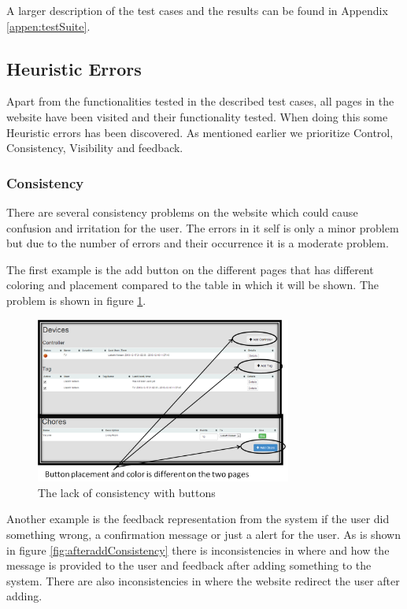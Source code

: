 A larger description of the test cases and the results can be found in Appendix \ref{appen:testSuite}.

\subsection{Heuristic Errors}
 Apart from the functionalities tested in the described test cases, all pages in the website have been visited and their functionality tested. When doing this some Heuristic errors has been discovered. As mentioned earlier we prioritize Control, Consistency, Visibility and feedback.


\subsubsection{Consistency}
There are several consistency problems on the website which could cause confusion and irritation for the user. The errors in it self is only a minor problem but due to the number of errors and their occurrence it is a moderate problem.   

The first example is the add button on the different pages that has different coloring and placement compared to the table in which it will be shown. The problem is shown in figure \ref{fig:consistencyButton}.

\begin{figure}
	\centering
		\includegraphics[width=0.75\textwidth]{images/consistencyButton.png}
	\caption{The lack of consistency with buttons}
	\label{fig:consistencyButton}
\end{figure}


Another example is the feedback representation from the system if the user did something wrong, a confirmation message or just a alert for the user. As is shown in figure \ref{fig:afteraddConsistency} there is inconsistencies in where and how the message is provided to the user and feedback after adding something to the system. There are also inconsistencies in where the website redirect the user after adding.

